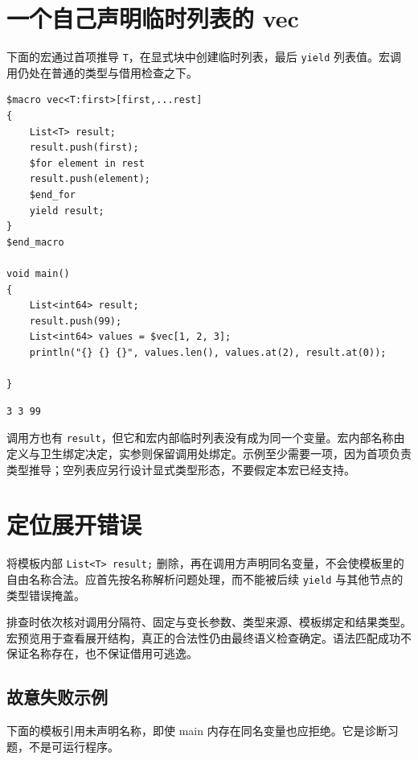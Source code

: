 \section{一个自己声明临时列表的 vec}

下面的宏通过首项推导 \texttt{T}，在显式块中创建临时列表，最后 \texttt{yield} 列表值。宏调用仍处在普通的类型与借用检查之下。

\par
\medskip
\begin{lstlisting}[style=chali]
$macro vec<T:first>[first,...rest]
{
    List<T> result;
    result.push(first);
    $for element in rest
    result.push(element);
    $end_for
    yield result;
}
$end_macro

void main()
{
    List<int64> result;
    result.push(99);
    List<int64> values = $vec[1, 2, 3];
    println("{} {} {}", values.len(), values.at(2), result.at(0));

}
\end{lstlisting}
\par
\medskip

\par
\medskip
\begin{lstlisting}[style=out]
3 3 99
\end{lstlisting}
\par
\medskip

调用方也有 \texttt{result}，但它和宏内部临时列表没有成为同一个变量。宏内部名称由定义与卫生绑定决定，实参则保留调用处绑定。示例至少需要一项，因为首项负责类型推导；空列表应另行设计显式类型形态，不要假定本宏已经支持。

\section{定位展开错误}

将模板内部 \texttt{List<\allowbreak{}T>\allowbreak{} result;} 删除，再在调用方声明同名变量，不会使模板里的自由名称合法。应首先按名称解析问题处理，而不能被后续 \texttt{yield} 与其他节点的类型错误掩盖。

排查时依次核对调用分隔符、固定与变长参数、类型来源、模板绑定和结果类型。宏预览用于查看展开结构，真正的合法性仍由最终语义检查确定。语法匹配成功不保证名称存在，也不保证借用可逃逸。

\subsection*{故意失败示例}

下面的模板引用未声明名称，即使 main 内存在同名变量也应拒绝。它是诊断习题，不是可运行程序。

